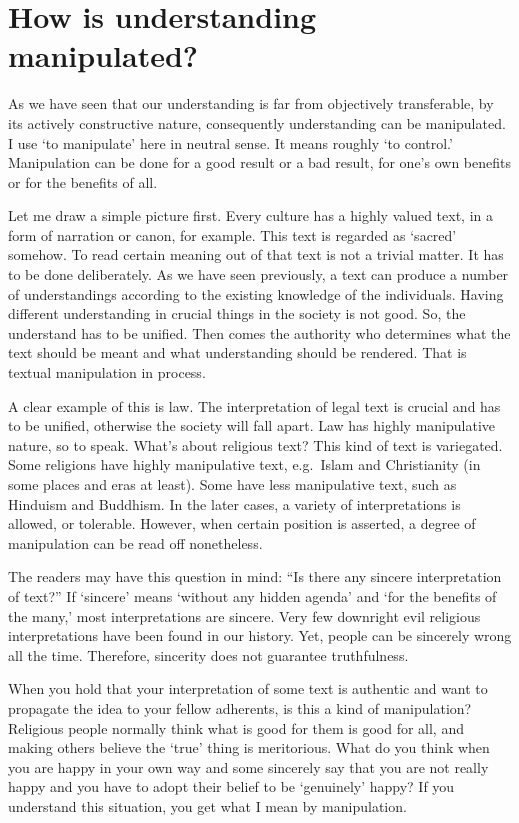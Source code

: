 \chapter{How is understanding manipulated?}\label{chap:howunderman}

As we have seen that our understanding is far from objectively transferable, by its actively constructive nature, consequently understanding can be manipulated. I use `to manipulate' here in neutral sense. It means roughly `to control.' Manipulation can be done for a good result or a bad result, for one's own benefits or for the benefits of all.

Let me draw a simple picture first. Every culture has a highly valued text, in a form of narration or canon, for example. This text is regarded as `sacred' somehow. To read certain meaning out of that text is not a trivial matter. It has to be done deliberately. As we have seen previously, a text can produce a number of understandings according to the existing knowledge of the individuals. Having different understanding in crucial things in the society is not good. So, the understand has to be unified. Then comes the authority who determines what the text should be meant and what understanding should be rendered. That is textual manipulation in process.

A clear example of this is law. The interpretation of legal text is crucial and has to be unified, otherwise the society will fall apart. Law has highly manipulative nature, so to speak. What's about religious text? This kind of text is variegated. Some religions have highly manipulative text, e.g.\ Islam and Christianity (in some places and eras at least). Some have less manipulative text, such as Hinduism and Buddhism. In the later cases, a variety of interpretations is allowed, or tolerable. However, when certain position is asserted, a degree of manipulation can be read off nonetheless.

The readers may have this question in mind: ``Is there any sincere interpretation of text?'' If `sincere' means `without any hidden agenda' and `for the benefits of the many,' most interpretations are sincere. Very few downright evil religious interpretations have been found in our history. Yet, people can be sincerely wrong all the time. Therefore, sincerity does not guarantee truthfulness.

When you hold that your interpretation of some text is authentic and want to propagate the idea to your fellow adherents, is this a kind of manipulation? Religious people normally think what is good for them is good for all, and making others believe the `true' thing is meritorious. What do you think when you are happy in your own way and some sincerely say that you are not really happy and you have to adopt their belief to be `genuinely' happy? If you understand this situation, you get what I mean by manipulation.

